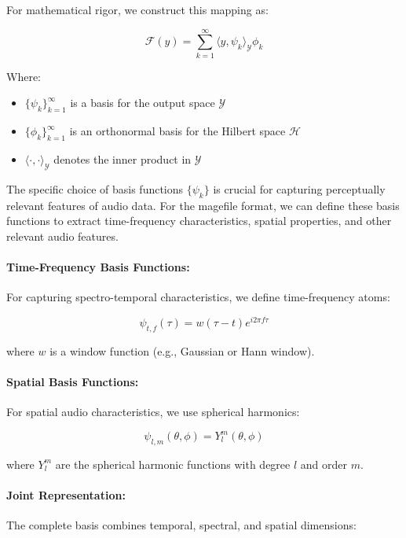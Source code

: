 For mathematical rigor, we construct this mapping as:

\begin{equation}
\mathcal{F}(y) = \sum_{k=1}^{\infty} \langle y, \psi_k \rangle_{\mathcal{Y}} \phi_k
\end{equation}

Where:
\begin{itemize}
\item $\{\psi_k\}_{k=1}^{\infty}$ is a basis for the output space $\mathcal{Y}$
\item $\{\phi_k\}_{k=1}^{\infty}$ is an orthonormal basis for the Hilbert space $\mathcal{H}$
\item $\langle \cdot, \cdot \rangle_{\mathcal{Y}}$ denotes the inner product in $\mathcal{Y}$
\end{itemize}

The specific choice of basis functions $\{\psi_k\}$ is crucial for capturing perceptually relevant features of audio data. For the magefile format, we can define these basis functions to extract time-frequency characteristics, spatial properties, and other relevant audio features.

\paragraph{Time-Frequency Basis Functions:}
For capturing spectro-temporal characteristics, we define time-frequency atoms:

\begin{equation}
\psi_{t,f}(\tau) = w(\tau-t) e^{i2\pi f \tau}
\end{equation}

where $w$ is a window function (e.g., Gaussian or Hann window).

\paragraph{Spatial Basis Functions:}
For spatial audio characteristics, we use spherical harmonics:

\begin{equation}
\psi_{l,m}(\theta, \phi) = Y_l^m(\theta, \phi)
\end{equation}

where $Y_l^m$ are the spherical harmonic functions with degree $l$ and order $m$.

\paragraph{Joint Representation:}
The complete basis combines temporal, spectral, and spatial dimensions:

